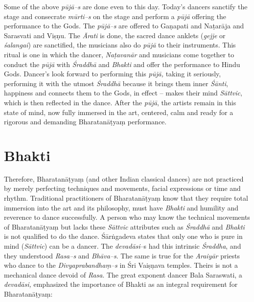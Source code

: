 Some of the above \textit{pūjā–s} are done even to this day. Today’s dancers sanctify the stage and consecrate \textit{mūrti–s} on the stage and perform a \textit{pūjā} offering the performance to the Gods. The \textit{pūjā–s }are offered to Gaṇapati and Naṭarāja and Sarasvati and Viṣṇu. The \textit{Ārati} is done, the sacred dance anklets (\textit{gejje} or \textit{śalangai}) are sanctified, the musicians also do \textit{pūjā }to their instruments. This ritual is one in which the dancer, \textit{Naṭavanār} and musicians come together to conduct the \textit{pūjā }with \textit{Śraddhā} and \textit{Bhakti} and offer the performance to Hindu Gods. Dancer’s look forward to performing this \textit{pūjā,} taking it seriously, performing it with the utmost \textit{Śraddhā} because it brings them inner \textit{Śānti}, happiness and connects them to the Gods, in effect – makes their mind \textit{Sāttvic}, which is then reflected in the dance. After the \textit{pūjā}, the artists remain in this state of mind, now fully immersed in the art, centered, calm and ready for a rigorous and demanding Bharatanāṭyaṃ performance.


\section*{Bhakti}

Therefore, Bharatanāṭyaṃ (and other Indian classical dances) are not practiced by merely perfecting techniques and movements, facial expressions or time and rhythm. Traditional practitioners of Bharatanāṭyaṃ know that they require total immersion into the art and its philosophy, must have \textit{Bhakti} and humility and reverence to dance successfully. A person who may know the technical movements of Bharatanāṭyaṃ but lacks these \textit{Sāttvic} attributes such as \textit{Śraddhā} and \textit{Bhakti} is not qualified to do the dance. Śārṅgadeva states that only one who is pure in mind (\textit{Sāttvic}) can be a dancer. The \textit{devadāsi}–s had this intrinsic \textit{Śraddha}, and they understood \textit{Rasa–s} and\textit{ Bhāva–s}. The same is true for the \textit{Araiyār} priests who dance to the \textit{Divyaprabandhaṃ–s} in Śri Vaiṣṇava temples. Theirs is not a mechanical dance devoid of \textit{Rasa}. The great exponent dancer Bala Saraswati, a \textit{devadāsi,} emphasized the importance of Bhakti as an integral requirement for Bharatanāṭyaṃ:

\vskip 3pt

